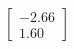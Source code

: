\documentclass[preview]{standalone}
\begin{document}
\begin{align*}
\begin{bmatrix} -2.66 \\ 1.60 \end{bmatrix}
\end{align*}
\end{document}
